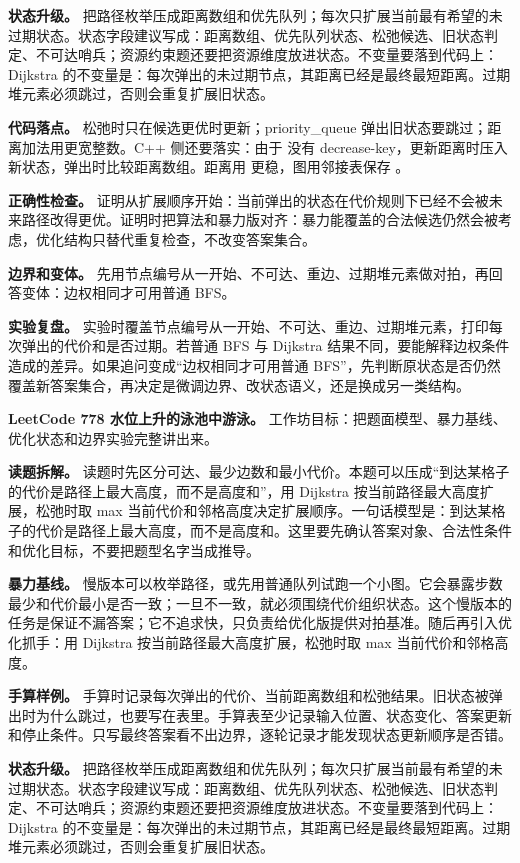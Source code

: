 \textbf{状态升级。} 把路径枚举压成距离数组和优先队列；每次只扩展当前最有希望的未过期状态。状态字段建议写成：距离数组、优先队列状态、松弛候选、旧状态判定、不可达哨兵；资源约束题还要把资源维度放进状态。不变量要落到代码上：Dijkstra 的不变量是：每次弹出的未过期节点，其距离已经是最终最短距离。过期堆元素必须跳过，否则会重复扩展旧状态。

\textbf{代码落点。} 松弛时只在候选更优时更新；priority\_queue 弹出旧状态要跳过；距离加法用更宽整数。C++ 侧还要落实：由于  没有 decrease-key，更新距离时压入新状态，弹出时比较距离数组。距离用  更稳，图用邻接表保存 。

\textbf{正确性检查。} 证明从扩展顺序开始：当前弹出的状态在代价规则下已经不会被未来路径改得更优。证明时把算法和暴力版对齐：暴力能覆盖的合法候选仍然会被考虑，优化结构只替代重复检查，不改变答案集合。

\textbf{边界和变体。} 先用节点编号从一开始、不可达、重边、过期堆元素做对拍，再回答变体：边权相同才可用普通 BFS。

\textbf{实验复盘。} 实验时覆盖节点编号从一开始、不可达、重边、过期堆元素，打印每次弹出的代价和是否过期。若普通 BFS 与 Dijkstra 结果不同，要能解释边权条件造成的差异。如果追问变成“边权相同才可用普通 BFS”，先判断原状态是否仍然覆盖新答案集合，再决定是微调边界、改状态语义，还是换成另一类结构。

\noindent\textbf{LeetCode 778 水位上升的泳池中游泳。} 工作坊目标：把题面模型、暴力基线、优化状态和边界实验完整讲出来。

\textbf{读题拆解。} 读题时先区分可达、最少边数和最小代价。本题可以压成“到达某格子的代价是路径上最大高度，而不是高度和”，用 Dijkstra 按当前路径最大高度扩展，松弛时取 max 当前代价和邻格高度决定扩展顺序。一句话模型是：到达某格子的代价是路径上最大高度，而不是高度和。这里要先确认答案对象、合法性条件和优化目标，不要把题型名字当成推导。

\textbf{暴力基线。} 慢版本可以枚举路径，或先用普通队列试跑一个小图。它会暴露步数最少和代价最小是否一致；一旦不一致，就必须围绕代价组织状态。这个慢版本的任务是保证不漏答案；它不追求快，只负责给优化版提供对拍基准。随后再引入优化抓手：用 Dijkstra 按当前路径最大高度扩展，松弛时取 max 当前代价和邻格高度。

\textbf{手算样例。} 手算时记录每次弹出的代价、当前距离数组和松弛结果。旧状态被弹出时为什么跳过，也要写在表里。手算表至少记录输入位置、状态变化、答案更新和停止条件。只写最终答案看不出边界，逐轮记录才能发现状态更新顺序是否错。

\textbf{状态升级。} 把路径枚举压成距离数组和优先队列；每次只扩展当前最有希望的未过期状态。状态字段建议写成：距离数组、优先队列状态、松弛候选、旧状态判定、不可达哨兵；资源约束题还要把资源维度放进状态。不变量要落到代码上：Dijkstra 的不变量是：每次弹出的未过期节点，其距离已经是最终最短距离。过期堆元素必须跳过，否则会重复扩展旧状态。

